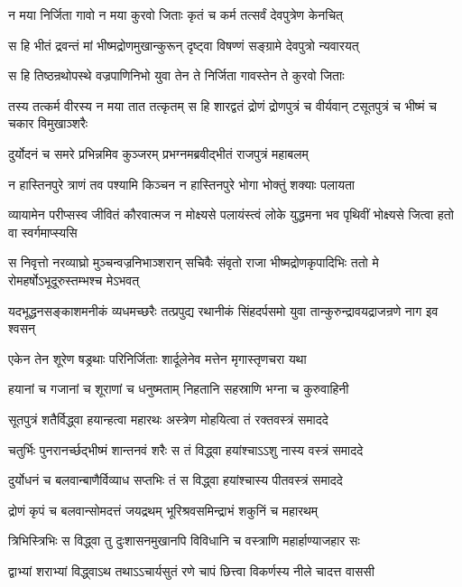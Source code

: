 


\twolineshloka
{न मया निर्जिता गावो न मया कुरवो जिताः}
{कृतं च कर्म तत्सर्वं देवपुत्रेण केनचित्}


\twolineshloka
{स हि भीतं द्रवन्तं मां भीष्मद्रोणमुखान्कुरून्}
{दृष्ट्वा विषण्णं सङ्ग्रामे देवपुत्रो न्यवारयत्}


\twolineshloka
{स हि तिष्ठन्रथोपस्थे वज्रपाणिनिभो युवा}
{तेन ते निर्जिता गावस्तेन ते कुरवो जिताः}


\threelineshloka
{तस्य तत्कर्म वीरस्य न मया तात तत्कृतम्}
{स हि शारद्वतं द्रोणं द्रोणपुत्रं च वीर्यवान्}
{टसूतपुत्रं च भीष्मं च चकार विमुखाञ्शरैः}


\twolineshloka
{दुर्योदनं च समरे प्रभिन्नमिव कुञ्जरम्}
{प्रभग्नमब्रवीद्भीतं राजपुत्रं महाबलम्}


\twolineshloka
{न हास्तिनपुरे त्राणं तव पश्यामि किञ्चन}
{न हास्तिनपुरे भोगा भोक्तुं शक्याः पलायता}


\threelineshloka
{व्यायामेन परीप्सस्व जीवितं कौरवात्मज}
{न मोक्ष्यसे पलायंस्त्वं लोके युद्धमना भव}
{पृथिवीं भोक्ष्यसे जित्वा हतो वा स्वर्गमाप्स्यसि}


\threelineshloka
{स निवृत्तो नरव्याघ्रो मुञ्चन्वज्रनिभाञ्शरान्}
{सचिवैः संवृतो राजा भीष्मद्रोणकृपादिभिः}
{ततो मे रोमहर्षोऽभूदूरुस्तम्भश्च मेऽभवत्}


\threelineshloka
{यदभूद्धनसङ्काशमनीकं व्यधमच्छरैः}
{तत्प्रपुद्य रथानीकं सिंहदर्पसमो युवा}
{तान्कुरुन्द्रावयद्राजन्रणे नाग इव श्वसन्}


\twolineshloka
{एकेन तेन शूरेण षड्रथाः परिनिर्जिताः}
{शार्दूलेनेव मत्तेन मृगास्तृणचरा यथा}


\twolineshloka
{हयानां च गजानां च शूराणां च धनुष्मताम्}
{निहतानि सहस्राणि भग्ना च कुरुवाहिनी}


\twolineshloka
{सूतपुत्रं शतैर्विद्ध्वा हयान्हत्वा महारथः}
{अस्त्रेण मोहयित्वा तं रक्तवस्त्रं समाददे}


\twolineshloka
{चतुर्भिः पुनरानर्च्छद्भीष्मं शान्तनवं शरैः}
{स तं विद्ध्वा हयांश्चाऽऽशु नास्य वस्त्रं समाददे}


\twolineshloka
{दुर्योधनं च बलवान्बाणैर्विव्याध सप्तभिः}
{तं स विद्ध्वा हयांश्चास्य पीतवस्त्रं समाददे}


\twolineshloka
{द्रोणं कृपं च बलवान्सोमदत्तं जयद्रथम्}
{भूरिश्रवसमिन्द्राभं शकुनिं च महारथम्}


\twolineshloka
{त्रिभिस्त्रिभिः स विद्ध्वा तु दुःशासनमुखानपि}
{विविधानि च वस्त्राणि महार्हाण्याजहार सः}


\twolineshloka
{द्वाभ्यां शराभ्यां विद्ध्वाऽथ तथाऽऽचार्यसुतं रणे}
{चापं छित्त्वा विकर्णस्य नीले चादत्त वाससी}

